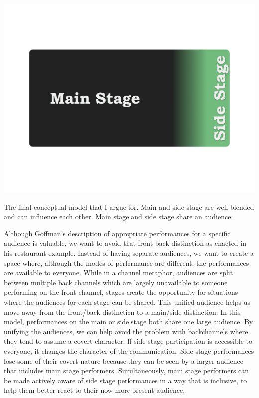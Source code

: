 \begin{marginfigure}
	\includegraphics{figures/main-side-final.png}
	\caption{The final conceptual model that I argue for. Main and side stage are well blended and can influence each other. Main stage and side stage share an audience.}
	\label{fig:main-side-stage}
\end{marginfigure}


Although Goffman's description of appropriate performances for a specific audience is valuable, we want to avoid that front-back distinction as enacted in his restaurant example. Instead of having separate audiences, we want to create a space where, although the modes of performance are different, the performances are available to everyone. While in a channel metaphor, audiences are split between multiple back channels which are largely unavailable to someone performing on the front channel, stages create the opportunity for situations where the audiences for each stage can be shared. This unified audience helps us move away from the front/back distinction to a main/side distinction. In this model, performances on the main or side stage both share one large audience. By unifying the audiences, we can help avoid the problem with backchannels where they tend to assume a covert character. If side stage participation is accessible to everyone, it changes the character of the communication. Side stage performances lose some of their covert nature because they can be seen by a larger audience that includes main stage performers. Simultaneously, main stage performers can be made actively aware of side stage performances in a way that is inclusive, to help them better react to their now more present audience.

